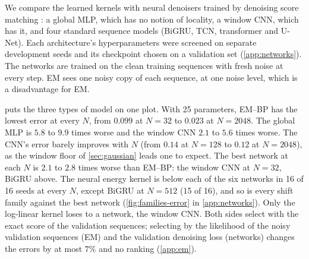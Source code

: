 We compare the learned kernels with neural denoisers trained by denoising score matching
\cite{vincent2011connection}: a global MLP, which has no notion of locality, a window CNN, which has it, and four
standard sequence models (BiGRU, TCN, transformer and U-Net). Each architecture's hyperparameters were screened on
separate development seeds and its checkpoint chosen on a validation set (\cref{app:networks}). The networks are
trained on the clean training sequences with fresh noise at every step. EM sees one noisy copy of each sequence, at
one noise level, which is a disadvantage for EM.

 puts the three types of model on one plot. With 25 parameters, EM--BP has the lowest
error at every $N$, from $0.099$ at $N=32$ to $0.023$ at $N=2048$.
The global MLP is $5.8$ to $9.9$ times worse and the window CNN $2.1$ to $5.6$ times worse. The CNN's error barely
improves with $N$ (from $0.14$ at $N=128$ to $0.12$ at $N=2048$), as the window floor of \cref{sec:gaussian}
leads one to expect. The best network at each $N$ is $2.1$ to $2.8$ times worse than EM--BP: the window CNN at
$N=32$, BiGRU above.
The neural energy kernel is below each of the six networks in 16 of 16 seeds at every $N$, except BiGRU at
$N=512$ (15 of 16), and so is every shift family against the best network (\cref{fig:families-error} in
\cref{app:networks}). Only the log-linear kernel loses to a network, the window CNN.
Both sides select with the exact score of the validation sequences; selecting by the likelihood of the noisy
validation sequences (EM) and the validation denoising loss (networks) changes the errors by at most $7\%$ and no ranking
(\cref{app:em}).

